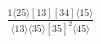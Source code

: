 \documentclass[varwidth, border=5pt]{standalone}
\begin{document}
\begin{my}
$\begin{gathered}
\scriptscriptstyle\frac{1⟨25⟩[13][34]⟨15⟩}{⟨13⟩⟨35⟩[35]^2⟨45⟩}
\end{gathered}$
\end{my}
\end{document}
